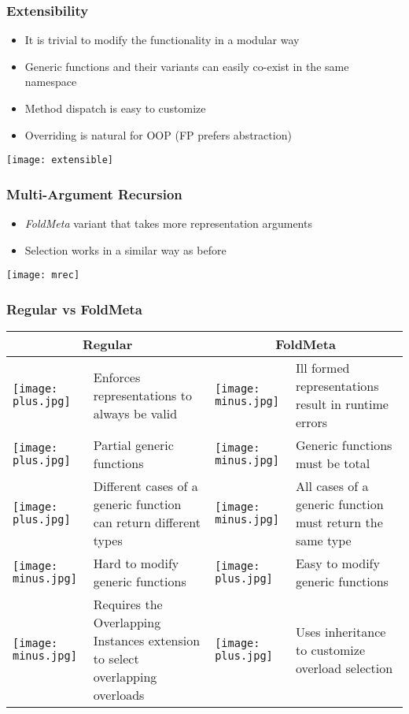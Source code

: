 \documentclass{beamer}
\newcommand{\pos}{

    \texttt{[image: plus.jpg]}
}
\newcommand{\nig}{

  \texttt{[image: minus.jpg]}
}
\begin{document}
\begin{frame}
  \frametitle{Extensibility}
  \begin{itemize}
  \item It is trivial to modify the functionality in a modular way
  \item Generic functions and their variants can easily co-exist in
    the same namespace
  \item Method dispatch is easy to customize
  \item Overriding is natural for OOP (FP prefers abstraction)
  \end{itemize}
  
  \centering\texttt{[image: extensible]}
\end{frame}

\begin{frame}
  \frametitle{Multi-Argument Recursion}
  \begin{itemize}
  \item \emph{FoldMeta} variant that takes more representation
    arguments
  \item Selection works in a similar way as before
  \end{itemize}
  
  \texttt{[image: mrec]}
  
\end{frame}

\begin{frame}

  \frametitle{Regular vs FoldMeta}

  \begin{tabular}{l p{4cm} l p{4cm}}
    \hline
    \multicolumn{2}{c}{Regular} & \multicolumn{2}{c}{FoldMeta} \\
    \hline

    \pos & Enforces representations to always be valid & \nig & Ill
    formed representations result in runtime errors \\

    \pos & Partial generic functions & \nig & Generic functions must
    be total \\

    \pos & Different cases of a generic function can return different
    types & \nig & All cases of a generic function must return the same type \\

    \nig & Hard to modify generic functions & \pos & Easy to
    modify generic functions \\

    \nig & Requires the Overlapping Instances extension to select
    overlapping overloads & \pos & Uses inheritance to customize
    overload selection \\
    
  \end{tabular}
  
\end{frame}
\end{document}
